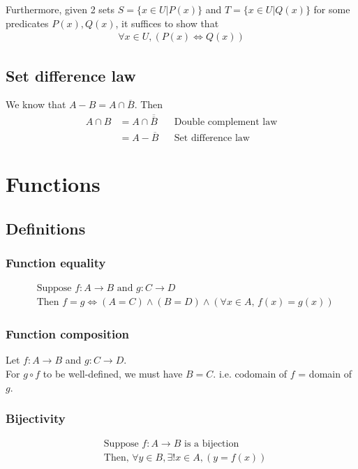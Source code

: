 \documentclass{article}
\begin{document}
Furthermore, given 2 sets $S=\{x\in U| P(x)\}$ and $T=\{x\in U| Q(x)\}$ for some predicates $P(x),Q(x)$, it suffices to show that 
\begin{align*}
	\forall x\in U, (P(x)\iff Q(x))
\end{align*}

\subsection{Set difference law}
We know that $A-B=A\cap \overline{B}$.
Then
\begin{align*}
    A\cap B&=A\cap \overline{\overline{B}} &&\text{Double complement law}\\
    &=A-\overline{B} &&\text{Set difference law}
\end{align*}

\section{Functions}
\subsection{Definitions}
\subsubsection{Function equality}
\begin{align*}
    &\text{Suppose } f:A\rightarrow B \text{ and } g:C\rightarrow D\\
    &\text{Then } f=g\Longleftrightarrow (A=C)\land (B=D)\land (\forall x\in A,\, f\left(x\right)=g\left(x\right))
\end{align*}

\subsubsection{Function composition}
Let $f: A\rightarrow B$ and $g: C\rightarrow D$.\\
For $g\circ f$ to be well-defined, we must have $B=C$.
i.e. codomain of $f$ = domain of $g$.

\subsubsection{Bijectivity}
\begin{align*}
    &\text{Suppose }f:A\rightarrow B\text{ is a bijection}\\
    &\text{Then, }\forall y\in B,\exists!x\in A,\left(y=f\left(x\right)\right)
\end{align*}
\end{document}
